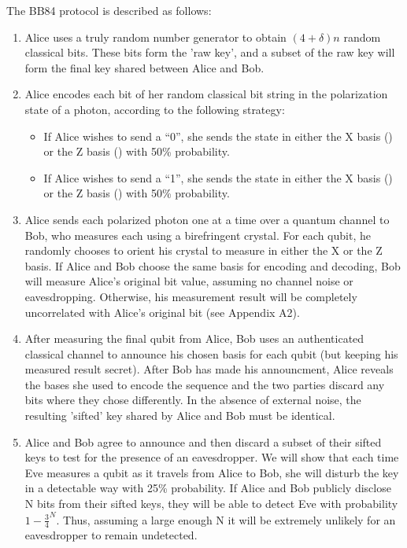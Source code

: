 \documentclass[conference]{IEEEtran}
\begin{document}
The BB84 protocol is described as follows\cite{BB84}:
\begin{enumerate}
\item Alice uses a truly random number generator to obtain $(4 + \delta)n$ random classical bits. These bits form the 'raw key', and a subset of the raw key will form the final key shared between Alice and Bob.
\item Alice encodes each bit of her random classical bit string in the polarization state of a photon, according to the following strategy:
  \begin{itemize}
  \item If Alice wishes to send a ``0'', she sends the  state in either the X basis (\ket{\uparrow}) or the Z basis (\ket{\nwarrow})  with 50\% probability.
  \item If Alice wishes to send a ``1'', she sends the  state in either the X basis (\ket{\rightarrow}) or the Z basis (\ket{\nearrow}) with 50\% probability.
  \end{itemize}
\item Alice sends each polarized photon one at a time over a quantum channel to Bob, who measures each using a birefringent crystal. For each qubit, he randomly chooses to orient his crystal to measure in either the X or the Z basis. If Alice and Bob choose the same basis for encoding and decoding, Bob will measure Alice's original bit value, assuming no channel noise or eavesdropping. Otherwise, his measurement result will be completely uncorrelated with Alice's original bit (see Appendix A2).
\item After measuring the final qubit from Alice, Bob uses an authenticated classical channel to announce his chosen basis for each qubit (but keeping his measured result secret). After Bob has made his announcment, Alice reveals the bases she used to encode the sequence and the two parties discard any bits where they chose differently. In the absence of external noise, the resulting 'sifted' key shared by Alice and Bob must be identical.
\item Alice and Bob agree to announce and then discard a subset of their sifted keys to test for the presence of an eavesdropper. We will show that each time Eve measures a qubit as it travels from Alice to Bob, she will disturb the key in a detectable way with 25\% probability. If Alice and Bob publicly disclose N bits from their sifted keys, they will be able to detect Eve with probability $1 - \frac{3}{4}^N$. Thus, assuming a large enough N it will be extremely unlikely for an eavesdropper to remain undetected.\\
\end{enumerate}
\end{document}
